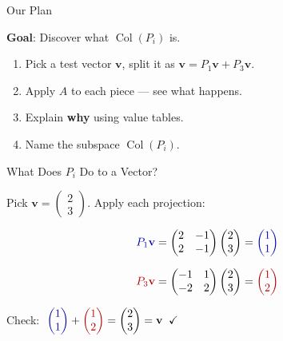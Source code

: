 \documentclass[10pt]{beamer}
\theoremstyle{definition}
\newcommand{\x}[1]{\alert{\textbf{#1}}}
\newcommand{\rd}[1]{{\color{red!70!black}#1}}
\newcommand{\bl}[1]{{\color{blue!70!black}#1}}
\begin{document}
\begin{frame}{Our Plan}

\vfill

\begin{center}
{\large \x{Goal}: Discover what $\operatorname{Col}(P_i)$ is.}
\end{center}

\vfill

\begin{enumerate}
\item Pick a test vector $\mathbf{v}$, split it as $\mathbf{v} = P_1\mathbf{v} + P_3\mathbf{v}$.
\item Apply $A$ to each piece --- see what happens.
\item Explain \x{why} using value tables.
\item Name the subspace $\operatorname{Col}(P_i)$.
\end{enumerate}

\vfill

\end{frame}


\begin{frame}{What Does $P_i$ Do to a Vector?}

Pick $\mathbf{v} = \begin{pmatrix}2\\3\end{pmatrix}$. \quad Apply each projection:

\vfill

$$\bl{P_1 \mathbf{v}} = \begin{pmatrix}2&-1\\2&-1\end{pmatrix}\begin{pmatrix}2\\3\end{pmatrix} = \bl{\begin{pmatrix}1\\1\end{pmatrix}}$$

\vfill

$$\rd{P_3 \mathbf{v}} = \begin{pmatrix}-1&1\\-2&2\end{pmatrix}\begin{pmatrix}2\\3\end{pmatrix} = \rd{\begin{pmatrix}1\\2\end{pmatrix}}$$

\vfill\pause

Check: $\;\bl{\begin{pmatrix}1\\1\end{pmatrix}} + \rd{\begin{pmatrix}1\\2\end{pmatrix}} = \begin{pmatrix}2\\3\end{pmatrix} = \mathbf{v}\;\;\checkmark$

\end{frame}
\end{document}
